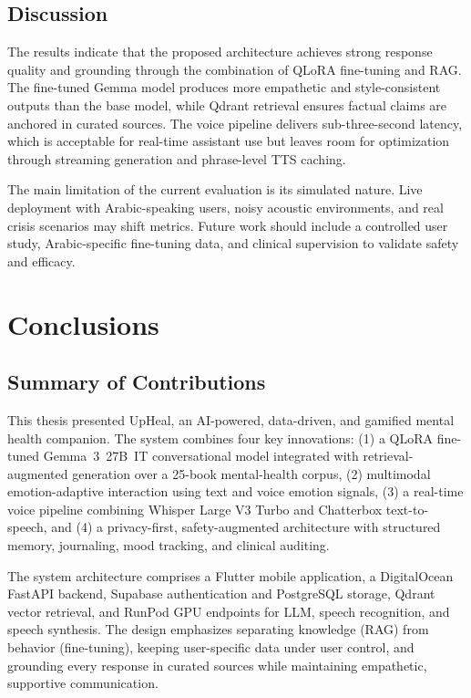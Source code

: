 \documentclass[12pt,a4paper,oneside,openany]{report}
\begin{document}
\section{Discussion}

The results indicate that the proposed architecture achieves strong response quality and grounding through the combination of QLoRA fine-tuning and RAG. The fine-tuned Gemma model produces more empathetic and style-consistent outputs than the base model, while Qdrant retrieval ensures factual claims are anchored in curated sources. The voice pipeline delivers sub-three-second latency, which is acceptable for real-time assistant use but leaves room for optimization through streaming generation and phrase-level TTS caching.

The main limitation of the current evaluation is its simulated nature. Live deployment with Arabic-speaking users, noisy acoustic environments, and real crisis scenarios may shift metrics. Future work should include a controlled user study, Arabic-specific fine-tuning data, and clinical supervision to validate safety and efficacy.

\chapter{Conclusions}
\label{ch:conclusions}

\section{Summary of Contributions}

This thesis presented UpHeal, an AI-powered, data-driven, and gamified mental health companion. The system combines four key innovations: (1) a QLoRA fine-tuned Gemma~3~27B~IT conversational model integrated with retrieval-augmented generation over a 25-book mental-health corpus, (2) multimodal emotion-adaptive interaction using text and voice emotion signals, (3) a real-time voice pipeline combining Whisper Large V3 Turbo and Chatterbox text-to-speech, and (4) a privacy-first, safety-augmented architecture with structured memory, journaling, mood tracking, and clinical auditing.

The system architecture comprises a Flutter mobile application, a DigitalOcean FastAPI backend, Supabase authentication and PostgreSQL storage, Qdrant vector retrieval, and RunPod GPU endpoints for LLM, speech recognition, and speech synthesis. The design emphasizes separating knowledge (RAG) from behavior (fine-tuning), keeping user-specific data under user control, and grounding every response in curated sources while maintaining empathetic, supportive communication.
\end{document}
